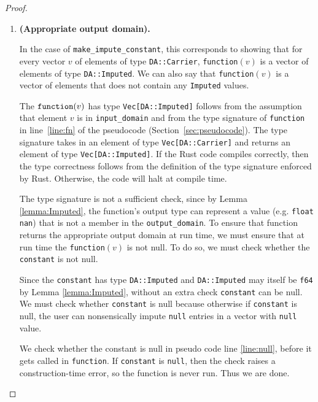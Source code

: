 \begin{proof}
\begin{enumerate}

\item \textbf{(Appropriate output domain).} 

In the case of \texttt{make\_impute\_constant}, this corresponds to showing that for every vector $v$ of elements of type \texttt{DA::Carrier},  \texttt{function}$(v)$ is a vector of elements of type \texttt{DA::Imputed}. We can also say that \texttt{function}$(v)$ is a vector of elements that does not contain any \texttt{Imputed} values.

The $\texttt{function}(v)$ has type \texttt{Vec[DA::Imputed]} follows from the assumption that element $v$ is in \texttt{input\_domain} and from the type signature of \texttt{function} in line~\ref{line:fn} of the pseudocode (Section~\ref{sec:pseudocode}). The type signature takes in an element of type \texttt{Vec[DA::Carrier]} and returns an element of type \texttt{Vec[DA::Imputed]}. If the Rust code compiles correctly, then the type correctness follows from the definition of the type signature enforced by Rust. Otherwise, the code will halt at compile time.

The type signature is not a sufficient check, since by Lemma \ref{lemma:Imputed}, the function's output type can represent a value (e.g. \texttt{float nan}) that is not a member in the \texttt{output\_domain}.  To ensure that function returns the appropriate output domain at run time, we must ensure that at run time the \texttt{function}$(v)$ is not null. To do so, we must check whether the \texttt{constant} is not null.

Since the \texttt{constant} has type \texttt{DA::Imputed} and \texttt{DA::Imputed} may itself be \texttt{f64} by Lemma \ref{lemma:Imputed}, without an extra check \texttt{constant} can be null. We must check whether \texttt{constant} is null because otherwise if \texttt{constant} is null, the user can nonsensically impute \texttt{null} entries in a vector with \texttt{null} value. 

We check whether the constant is null in pseudo code line \ref{line:null}, before it gets called in \texttt{function}. If \texttt{constant} is \texttt{null}, then the check raises a construction-time error, so the function is never run. Thus we are done.


\end{enumerate}
\end{proof}
